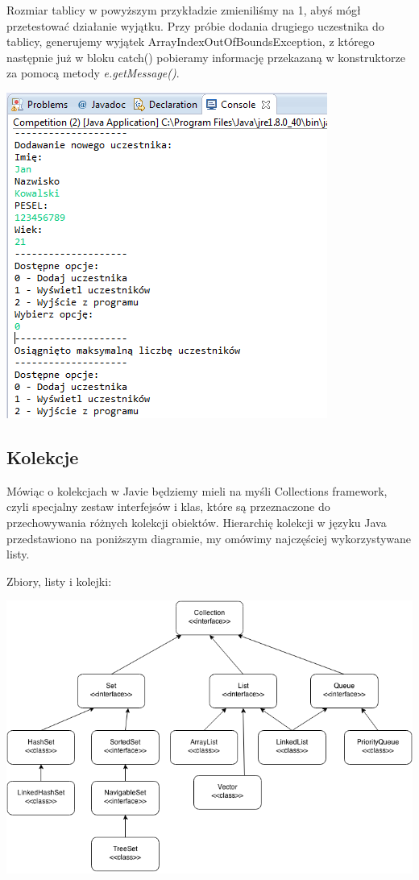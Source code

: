 \documentclass[letterpaper,10pt,english]{sphinxmanual}
\begin{document}
Rozmiar tablicy w powyższym przykładzie zmieniliśmy na 1, abyś mógł przetestować działanie wyjątku. Przy próbie dodania drugiego uczestnika do tablicy, generujemy wyjątek ArrayIndexOutOfBoundsException, z którego następnie już w bloku catch() pobieramy informację przekazaną w konstruktorze za pomocą metody \emph{e.getMessage()}.

{\hfill\includegraphics{aioobe.png}\hfill}


\subsection{Kolekcje}
\label{wyjkol:kolekcje}
Mówiąc o kolekcjach w Javie będziemy mieli na myśli Collections framework, czyli specjalny zestaw interfejsów i klas, które są przeznaczone do przechowywania różnych kolekcji obiektów. Hierarchię kolekcji w języku Java przedstawiono na poniższym diagramie, my omówimy najczęściej wykorzystywane listy.

Zbiory, listy i kolejki:

{\hfill\includegraphics{collections.png}\hfill}
\end{document}

